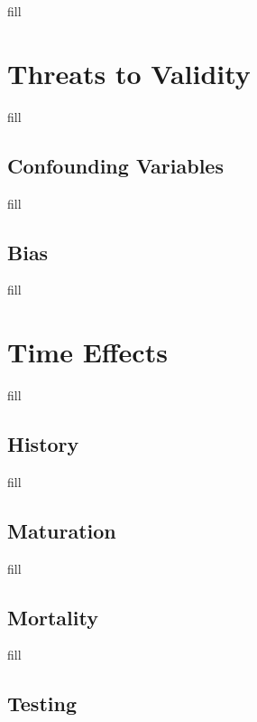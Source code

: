 \documentclass[
  b5paper]{book}
\begin{document}
fill

\hypertarget{threats-to-validity}{%
\section{Threats to Validity}\label{threats-to-validity}}

fill

\hypertarget{confounding-variables}{%
\subsection*{Confounding Variables}\label{confounding-variables}}

fill

\hypertarget{bias}{%
\subsection*{Bias}\label{bias}}

fill

\hypertarget{time-effects}{%
\section{Time Effects}\label{time-effects}}

fill

\hypertarget{history-2}{%
\subsection*{History}\label{history-2}}

fill

\hypertarget{maturation}{%
\subsection*{Maturation}\label{maturation}}

fill

\hypertarget{mortality}{%
\subsection*{Mortality}\label{mortality}}

fill

\hypertarget{testing}{%
\subsection*{Testing}\label{testing}}
\end{document}
